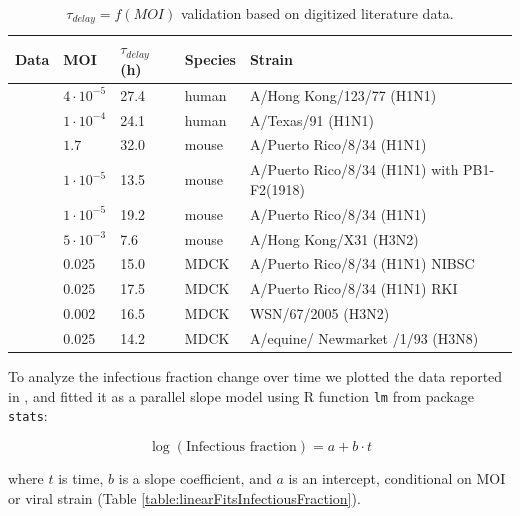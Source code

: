 \begin{table}[h!]
\centering
\caption[$\tau_{delay} = f(MOI)$ validation]{$\tau_{delay} = f(MOI)$ validation based on digitized literature data.}
\label{table:delayTauValidation}

\begin{tabular}{p{2cm} p{2cm} p{2cm} p{2cm} p{4cm}}
\hline 
\textbf{Data} & \textbf{MOI} & \textbf{$\tau_{delay}$ (h)} &  \textbf{Species} & \textbf{Strain}\\
\hline
\cite{baccam2006kinetics} & $4\cdot 10^{-5}$ & 27.4 & human & A/Hong Kong/123/77 (H1N1)\\
\cite{handel2007neuraminidase} & $1\cdot 10^{-4}$ & 24.1 & human & A/Texas/91 (H1N1)\\
\hline
\cite{handel2010towards} & $1.7$ & 32.0 & mouse & A/Puerto Rico/8/34 (H1N1)\\
\cite{smith2011effect} & $1\cdot 10^{-5}$ & 13.5 & mouse & A/Puerto Rico/8/34 (H1N1) with PB1-F2(1918)\\
\cite{smith2011effect} & $1\cdot 10^{-5}$ & 19.2 & mouse & A/Puerto Rico/8/34 (H1N1)\\
\cite{miao2010quantifying} & $5\cdot 10^{-3}$ & 7.6 & mouse & A/Hong  Kong/X31 (H3N2)\\
\hline
\cite{schulze2009infection} & 0.025 & 15.0 & MDCK & A/Puerto Rico/8/34 (H1N1) NIBSC\\
\cite{schulze2009infection} & 0.025 & 17.5 & MDCK & A/Puerto Rico/8/34 (H1N1) RKI\\
\cite{schulze2009infection} & 0.002 & 16.5 & MDCK & WSN/67/2005 (H3N2)\\
\cite{mohler2005mathematical} & 0.025 & 14.2 & MDCK & A/equine/ Newmarket /1/93 (H3N8)\\
\hline
\end{tabular}
\end{table}

To analyze the infectious fraction change over time we plotted the data reported in \cite{rudiger2019multiscale, schulze2009infection}, and fitted it as a parallel slope model using R function \texttt{lm} from package \texttt{stats}:

\begin{equation}
\log(\text{Infectious fraction}) = a + b \cdot t
\end{equation}

where $t$ is time, $b$ is a slope coefficient, and $a$ is an intercept, conditional on MOI \cite{rudiger2019multiscale} or viral strain \cite{schulze2009infection} (Table \ref{table:linearFitsInfectiousFraction}).

